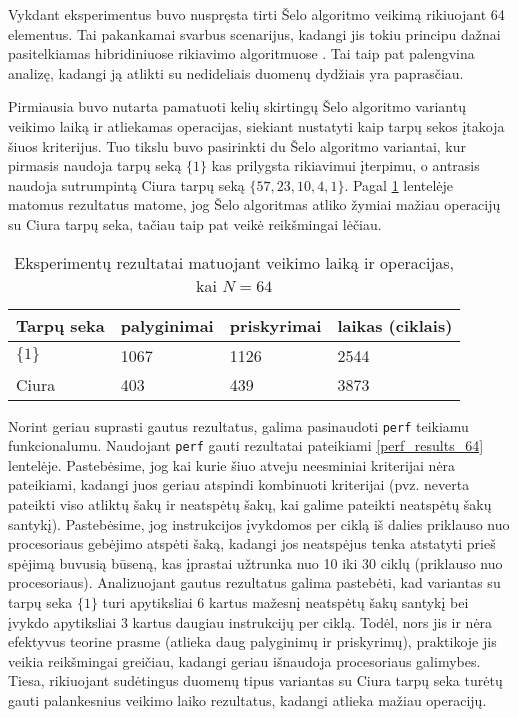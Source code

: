 \documentclass{VUMIFInfBakalaurinis}
\begin{document}
Vykdant eksperimentus buvo nuspręsta tirti Šelo algoritmo veikimą rikiuojant 64 elementus.
Tai pakankamai svarbus scenarijus, kadangi jis tokiu principu dažnai pasitelkiamas hibridiniuose rikiavimo algoritmuose \cite{golangsort,bzip2sort}.
Tai taip pat palengvina analizę, kadangi ją atlikti su nedideliais duomenų dydžiais yra paprasčiau.

Pirmiausia buvo nutarta pamatuoti kelių skirtingų Šelo algoritmo variantų veikimo laiką ir atliekamas operacijas, siekiant nustatyti kaip tarpų sekos įtakoja šiuos kriterijus.
Tuo tikslu buvo pasirinkti du Šelo algoritmo variantai, kur pirmasis naudoja tarpų seką $\{1\}$ kas prilygsta rikiavimui įterpimu, o antrasis naudoja sutrumpintą Ciura tarpų seką $\{57,23,10,4,1\}$.
Pagal \ref{experiment_results_64} lentelėje matomus rezultatus matome, jog Šelo algoritmas atliko žymiai mažiau operacijų su Ciura tarpų seka, tačiau taip pat veikė reikšmingai lėčiau.

\begin{table}[H]
  \caption{Eksperimentų rezultatai matuojant veikimo laiką ir operacijas, kai $N = 64$}
  \label{experiment_results_64}
  \centering
  \begin{tabular}{@{}llll@{}}
  Tarpų seka            & palyginimai       & priskyrimai      & laikas (ciklais) \\ \midrule
  $\{1\}$               & 1067              & 1126             & 2544                  \\
  Ciura                 & 403               & 439              & 3873                  \\ \bottomrule
  \end{tabular}
\end{table}

Norint geriau suprasti gautus rezultatus, galima pasinaudoti \verb|perf| teikiamu funkcionalumu.
Naudojant \verb|perf| gauti rezultatai pateikiami \ref{perf_results_64} lentelėje.
Pastebėsime, jog kai kurie šiuo atveju neesminiai kriterijai nėra pateikiami, kadangi juos geriau atspindi kombinuoti kriterijai
(pvz. neverta pateikti viso atliktų šakų ir neatspėtų šakų, kai galime pateikti neatspėtų šakų santykį).
Pastebėsime, jog instrukcijos įvykdomos per ciklą iš dalies priklauso nuo procesoriaus gebėjimo atspėti šaką, kadangi jos neatspėjus tenka atstatyti prieš spėjimą buvusią būseną,
kas įprastai užtrunka nuo 10 iki 30 ciklų (priklauso nuo procesoriaus).
Analizuojant gautus rezultatus galima pastebėti, kad variantas su tarpų seka $\{1\}$ turi apytiksliai 6 kartus mažesnį neatspėtų šakų santykį bei įvykdo apytiksliai 3 kartus daugiau instrukcijų per ciklą.
Todėl, nors jis ir nėra efektyvus teorine prasme (atlieka daug palyginimų ir priskyrimų), praktikoje jis veikia reikšmingai greičiau, kadangi geriau išnaudoja procesoriaus galimybes.
Tiesa, rikiuojant sudėtingus duomenų tipus variantas su Ciura tarpų seka turėtų gauti palankesnius veikimo laiko rezultatus, kadangi atlieka mažiau operacijų.
\end{document}
